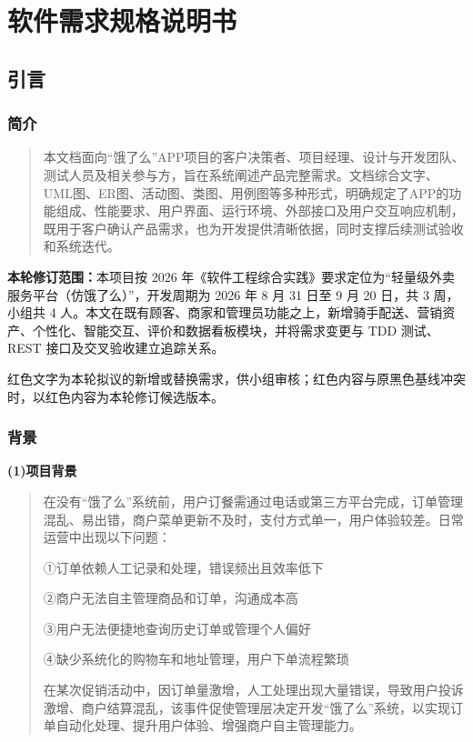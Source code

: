 \chapter{软件需求规格说明书}

\section{引言}\label{ux5f15ux8a00}

\subsection{简介}\label{ux7b80ux4ecb}

\begin{quote}
本文档面向``饿了么''APP项目的客户决策者、项目经理、设计与开发团队、测试人员及相关参与方，旨在系统阐述产品完整需求。文档综合文字、UML图、ER图、活动图、类图、用例图等多种形式，明确规定了APP的功能组成、性能要求、用户界面、运行环境、外部接口及用户交互响应机制，既用于客户确认产品需求，也为开发提供清晰依据，同时支撑后续测试验收和系统迭代。
\end{quote}

{\color{red}
\textbf{本轮修订范围：}本项目按 2026 年《软件工程综合实践》要求定位为``轻量级外卖服务平台（仿饿了么）''，开发周期为 2026 年 8 月 31 日至 9 月 20 日，共 3 周，小组共 4 人。本文在既有顾客、商家和管理员功能之上，新增骑手配送、营销资产、个性化、智能交互、评价和数据看板模块，并将需求变更与 TDD 测试、REST 接口及交叉验收建立追踪关系。

红色文字为本轮拟议的新增或替换需求，供小组审核；红色内容与原黑色基线冲突时，以红色内容为本轮修订候选版本。
}

\subsection{背景}\label{ux80ccux666f}

\textbf{(1)项目背景}

\begin{quote}
在没有``饿了么''系统前，用户订餐需通过电话或第三方平台完成，订单管理混乱、易出错，商户菜单更新不及时，支付方式单一，用户体验较差。日常运营中出现以下问题：

①订单依赖人工记录和处理，错误频出且效率低下

②商户无法自主管理商品和订单，沟通成本高

③用户无法便捷地查询历史订单或管理个人偏好

④缺少系统化的购物车和地址管理，用户下单流程繁琐

在某次促销活动中，因订单量激增，人工处理出现大量错误，导致用户投诉激增、商户结算混乱，该事件促使管理层决定开发``饿了么''系统，以实现订单自动化处理、提升用户体验、增强商户自主管理能力。
\end{quote}

